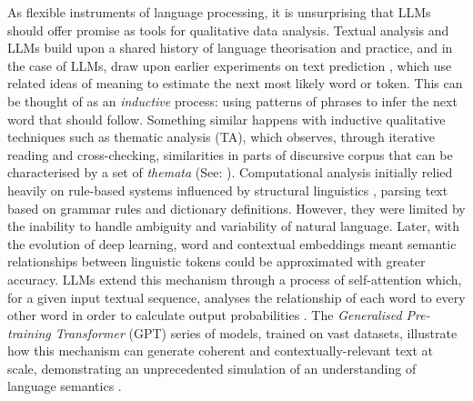 \documentclass{article}
\begin{document}
As flexible instruments of language processing, it is unsurprising that LLMs should offer promise as tools for qualitative data analysis. Textual analysis and LLMs build upon a shared history of language theorisation and practice, and in the case of LLMs, draw upon earlier experiments on text prediction \cite{olga2023generative}, which use related ideas of meaning to estimate the next most likely word or token. This can be thought of as an \emph{inductive} process: using patterns of phrases to infer the next word that should follow. Something similar happens with inductive qualitative techniques such as thematic analysis (TA), which observes, through iterative reading and cross-checking, similarities in parts of discursive corpus that can be characterised by a set of \emph{themata} (See: \cite{mertonThematicAnalysisScience1975}). Computational analysis initially relied heavily on rule-based systems influenced by structural linguistics \cite{chomskySyntacticStructures1957, olga2023generative}, parsing text based on grammar rules and dictionary definitions. However, they were limited by the inability to handle ambiguity and variability of natural language. Later, with the evolution of deep learning, word \cite{bengioNeuralProbabilisticLanguage2000, mikolovEfficientEstimationWord2013} and contextual \cite{devlinBERTPretrainingDeep2019, petersDeepContextualizedWord2018} embeddings meant semantic relationships between linguistic tokens could be approximated with greater accuracy. LLMs extend this mechanism through a process of self-attention which, for a given input textual sequence, analyses the relationship of each word to every other word in order to calculate output probabilities \cite{vaswaniAttentionAllYou2017}. The \emph{Generalised Pre-training Transformer} (GPT) series of models, trained on vast datasets, illustrate how this mechanism can generate coherent and contextually-relevant text at scale, demonstrating an unprecedented simulation of an understanding of language semantics \cite{radfordLanguageModelsAre2019}. 
\end{document}
